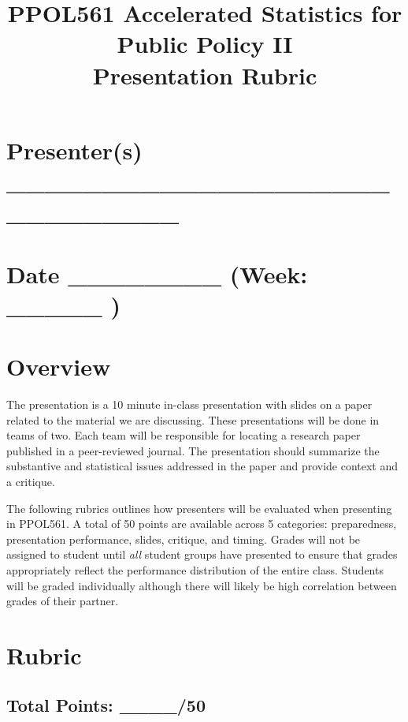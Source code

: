 \documentclass[
]{article}
\title{PPOL561 \textbar{} Accelerated Statistics for Public Policy II\\
Presentation Rubric}
\author{}
\date{\vspace{-2.5em}}
\begin{document}
\maketitle

\hypertarget{presenters-_____________________________}{%
\section{Presenter(s)
\_\_\_\_\_\_\_\_\_\_\_\_\_\_\_\_\_\_\_\_\_\_\_\_\_\_\_\_\_}\label{presenters-_____________________________}}

\hypertarget{date-________-week-_____}{%
\section{Date \_\_\_\_\_\_\_\_ (Week: \_\_\_\_\_
)}\label{date-________-week-_____}}

\hypertarget{overview}{%
\section{Overview}\label{overview}}

The presentation is a 10 minute in-class presentation with slides on a
paper related to the material we are discussing. These presentations
will be done in teams of two. Each team will be responsible for locating
a research paper published in a peer-reviewed journal. The presentation
should summarize the substantive and statistical issues addressed in the
paper and provide context and a critique.

The following rubrics outlines how presenters will be evaluated when
presenting in PPOL561. A total of 50 points are available across 5
categories: preparedness, presentation performance, slides, critique,
and timing. Grades will not be assigned to student until \emph{all}
student groups have presented to ensure that grades appropriately
reflect the performance distribution of the entire class. Students will
be graded individually although there will likely be high correlation
between grades of their partner.

\hypertarget{rubric}{%
\section{Rubric}\label{rubric}}

\hypertarget{total-points-____50}{%
\subsection{Total Points: \_\_\_\_/50}\label{total-points-____50}}
\end{document}
